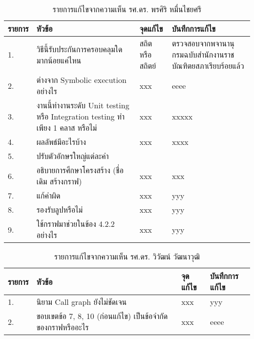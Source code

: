 \begin{table}[ht!]
    \caption{รายการแก้ไขจากความเห็น รศ.ดร. พรศิริ หมื่นไชยศรี}
    \centering
    \begin{tabularx}{\textwidth}{|l|l|l|X|}
        \hline
        \rowcolor{LightGray} 
        {\bf รายการ}    & {\bf หัวข้อ}                            & {\bf จุดแก้ไข}          & {\bf บันทึกการแก้ไข} \\ \hline
        1.              & วิธีนี้รับประกันการครอบคลุมใด มากน้อยแค่ไหน    & สถิต หรือ สถิตย์          & ตรวจสอบจากพจานานุกรมฉบับสำนักงานราชบัณฑิตยสภาเรียบร้อยแล้ว \\ \hline
        2.              & ต่างจาก Symbolic execution อย่างไร      & xxx                   & eeee \\ \hline
        3.              & งานนี้ทำงานระดับ Unit testing หรือ Integration testing ทำเพียง 1 คลาส หรือไม่ 
                                                                & xxx                   & xxxxx \\ \hline
        4.              & ผลลัพธ์มีอะไรบ้าง                         & xxx                   & xxxx \\ \hline
        5.              & ปรับตัวอักษรใหญ่แต่ละคำ                    &                       &           \\ \hline 
        6.              & อธิบายการศึกษาโครงสร้าง (ชื่อเดิม สร้างกราฟ) & xxx                   & xxx \\ \hline
        7.              & แก้คำผิด                                & xxx                   & yyy \\ \hline
        8.              & รองรับลูปหรือไม่                          & xxx                   & yyy \\ \hline
        9.              & ใช้กราฟมาช่วยในข้อง 4.2.2 อย่างไร         & xxx                   & yyy \\ \hline
    \end{tabularx}
\end{table}

\begin{table}[ht!]
    \caption{รายการแก้ไขจากความเห็น รศ.ดร. วิวัฒน์ วัฒนาวุฒิ}
    \centering
    \begin{tabularx}{\textwidth}{|l|l|l|X|}
        \hline
        \rowcolor{LightGray} 
        {\bf รายการ}    & {\bf หัวข้อ}                            & {\bf จุดแก้ไข}          & {\bf บันทึกการแก้ไข} \\ \hline
        1.              & นิยาม Call graph ยังไม่ชัดเจน             & xxx                   & yyy \\ \hline
        2.              & ขอบเขตข้อ 7, 8, 10 (ก่อนแก้ไข) เป็นข้อจำกัดของกราฟหรืออะไร      & xxx                   & eeee \\ \hline
    \end{tabularx}
\end{table}

